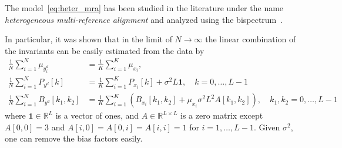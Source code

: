 \documentclass[english,12pt]{article}
\numberwithin{equation}{section}
\numberwithin{thm}{section} %
\begin{document}
The model~\eqref{eq:heter_mra} has been studied in the literature under the name \emph{heterogeneous multi-reference alignment} and analyzed using the bispectrum~\cite{perry2017sample,bandeira2017estimation,boumal2018heterogeneous}. 

In particular, it was shown that in the limit of $N\to\infty$ the linear combination of the invariants can be easily estimated from the data by 
\begin{align} \label{eq:mix_invariants}
\frac{1}{N}\sum_{i=1}^N \mu_{y_i^d} &= \frac{1}{K}\sum_{i=1}^K \mu_{x_i}, \nonumber\\
\frac{1}{N}\sum_{i=1}^N  P_{y^d}[k] &= \frac{1}{K}\sum_{i=1}^K P_{x_i}[k] + \sigma^2L\mathbf{1}, \quad k=0,\ldots,L-1\\
\frac{1}{N}\sum_{i=1}^N B_{y^d}[k_1,k_2] &= \frac{1}{K}\sum_{i=1}^K (B_{x_i} [k_1,k_2]+\mu_{x_i}\sigma^2L^2 A[k_1,k_2] ), \quad  k_1,k_2=0,\ldots,L-1 \nonumber
\end{align}
where $\mathbf{1}\in\mathbb{R}^L$ is a vector of ones, and $A\in\mathbb{R}^{L\times L}$ is a zero matrix except $A[0,0]=3$ and $A[i,0]=A[0,i]=A[i,i]=1$ for $i=1,\ldots,L-1$.
Given $\sigma^2$, one can remove the bias factors easily. 
\end{document}
